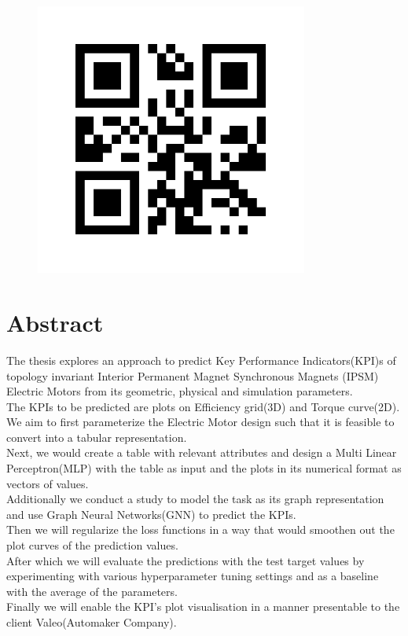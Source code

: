 \documentclass{report} %
\begin{document}
\begin{figure}[h]
    \includegraphics[width=0.8\textwidth]{./ReportImages/qrcode.png} %
    \label{fig:your-image}
\end{figure}

\newpage %

\chapter*{Abstract}

The thesis explores an approach to predict Key Performance Indicators(KPI)s of topology invariant Interior Permanent Magnet Synchronous Magnets (IPSM) Electric Motors from its geometric, physical and simulation parameters.\\
The KPIs to be predicted are plots on Efficiency grid(3D) and Torque curve(2D).\\
We aim to first parameterize the Electric Motor design such that it is feasible to convert into a tabular representation. \\
Next, we would create a table with relevant attributes and design a Multi Linear Perceptron(MLP) with the table as input and the plots in its numerical format as vectors of values.\\
Additionally we conduct a study to model the task as its graph representation and use Graph Neural Networks(GNN) to predict the KPIs.\\
Then we will regularize the loss functions in a way that would smoothen out the plot curves of the prediction values.\\
After which we will evaluate the predictions with the test target values by experimenting with various hyperparameter tuning settings and as a baseline with the average of the parameters.\\
Finally we will enable the KPI's plot visualisation in a manner presentable to the client Valeo(Automaker Company).\\
\end{document}
